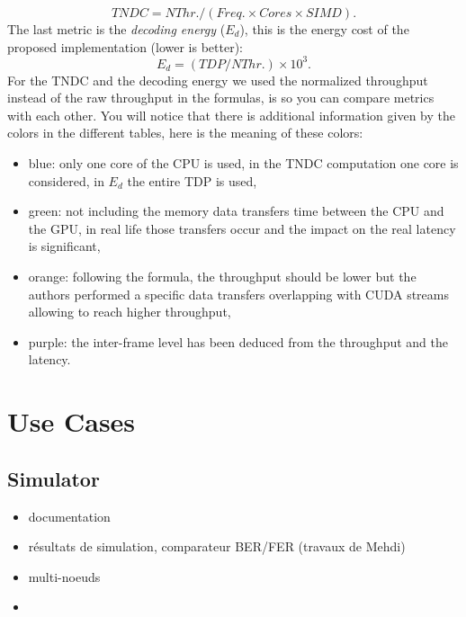 \begin{equation}
  TNDC = NThr. / (Freq. \times Cores \times SIMD).
\end{equation}
The last metric is the \emph{decoding energy} ($E_d$), this is the energy cost
of the proposed implementation (lower is better):
\begin{equation}
  E_d = (TDP / NThr.) \times 10^3.
\end{equation}
For the TNDC and the decoding energy we used the normalized throughput instead
of the raw throughput in the formulas, is so you can compare metrics with each
other. You will notice that there is additional information given by the colors
in the different tables, here is the meaning of these colors:
\begin{itemize}
  \item {\color{Paired-1}blue}: only one core of the CPU is used, in the TNDC
    computation one core is considered, in $E_d$ the entire TDP is used,
  \item {\color{Paired-3}green}: not including the memory data transfers time
    between the CPU and the GPU, in real life those transfers occur and the
    impact on the real latency is significant,
  \item {\color{Paired-7}orange}: following the formula, the throughput should
    be lower but the authors performed a specific data transfers overlapping
    with CUDA streams allowing to reach higher throughput,
  \item {\color{Paired-9}purple}: the inter-frame level has been deduced from
    the throughput and the latency.
\end{itemize}

\section{Use Cases}

\subsection{Simulator}

\begin{itemize}
  \item documentation
  \item résultats de simulation, comparateur BER/FER (travaux de Mehdi)
  \item multi-noeuds
  \item \cite{Cassagne2017,Cassagne2017a}
\end{itemize}

